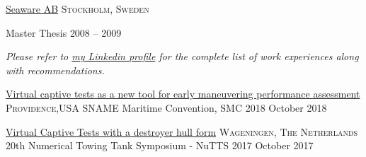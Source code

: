 \documentclass[10pt,a4paper]{article} %
\begin{document}
\headedsection %
{\href{http://www.stormgeo.com/}{Seaware AB}}
{\textsc{Stockholm, Sweden}} {

\headedsubsection %
{Master Thesis}
{2008 -- 2009}
{}
}

\begin{center}
\textit{Please refer to \href{https://www.linkedin.com/in/martin-alexandersson-77823312/}{my Linkedin profile} for the complete list of work experiences along with recommendations.}
\end{center}


\spacedhrule{-0.2em}{-0.4em} %



\headedsection 
{\href{https://www.researchgate.net/publication/332671240_Virtual_captive_tests_as_a_new_tool_for_early_maneuvering_performance_assessment}{Virtual captive tests as a new tool for early maneuvering performance assessment}}
{\textsc{Providence,USA}} {
\headedsubsection %
{SNAME Maritime Convention, SMC 2018}
{October 2018}
{\bodytext{ }}
}

\headedsection 
{\href{https://www.researchgate.net/publication/320299350_Virtual_Captive_Tests_with_a_destroyer_hull_form}{Virtual Captive Tests with a destroyer hull form}}
{\textsc{Wageningen, The Netherlands}} {
\headedsubsection %
{20th Numerical Towing Tank Symposium - NuTTS 2017}
{October 2017}
{\bodytext{ }}
}

 



\spacedhrule{0.5em}{-0.4em} %


\end{document}
